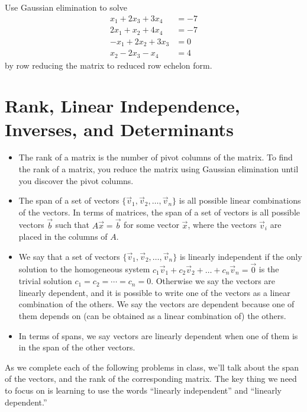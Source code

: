 \begin{problem}
Use Gaussian elimination to solve 
 $$
\begin{array}{rl}
 x_1 + 2x_3 + 3x_4 &= -7 \\
 2x_1 +x_2 + 4x_4 &= -7 \\
 -x_1 + 2x_2 + 3x_3  &= 0 \\
 x_2  -2x_3  -x_4 &= 4
\end{array}
$$
by row reducing the matrix to reduced row echelon form.

\end{problem}




\section{Rank, Linear Independence, Inverses, and Determinants}

\begin{definition}
\begin{itemize}
 \item The rank of a matrix is the number of pivot columns of the matrix. To find the rank of a matrix, you reduce the matrix using Gaussian elimination until you discover the pivot columns.
 \item The span of a set of vectors $\{\vec v_1,\vec v_2, \ldots, \vec v_n\}$ is all possible linear combinations of the vectors. In terms of matrices, the span of a set of vectors is all possible vectors $\vec b$ such that $A\vec x=\vec b$ for some vector $\vec x$, where the vectors $\vec v_i$ are placed in the columns of $A$.
 \item We say that a set of vectors $\{\vec v_1,\vec v_2, \ldots, \vec v_n\}$ is linearly independent if the only solution to the homogeneous system $c_1\vec v_{1}+c_2\vec v_{2}+\ldots+c_n\vec v_{n}=\vec 0$ is the trivial solution $c_1=c_2=\cdots=c_n=0$. 
Otherwise we say the vectors are linearly dependent, and it is possible to write one of the vectors as a linear combination of the others. 
We say the vectors are dependent because one of them depends on (can be obtained as a linear combination of) the others. 
 \item In terms of spans, we say vectors are linearly dependent when one of them is in the span of the other vectors. 
\end{itemize}
\end{definition}

As we complete each of the following problems in class, we'll talk about the span of the vectors, and the rank of the corresponding matrix.  The key thing we need to focus on is learning to use the words ``linearly independent'' and ``linearly dependent.''

